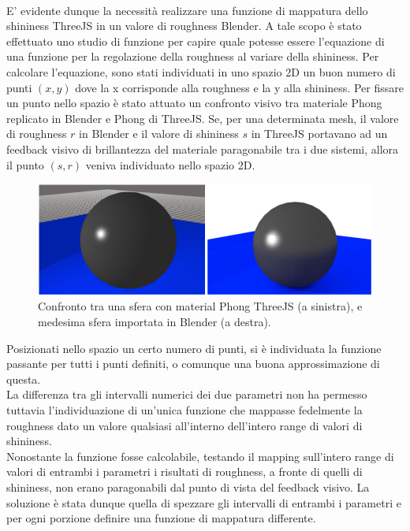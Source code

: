 \\
E’ evidente dunque la necessità realizzare una funzione di mappatura dello shininess ThreeJS in un valore di roughness Blender. A tale scopo è stato effettuato uno studio di funzione per capire quale potesse essere l’equazione di una funzione per la regolazione della roughness al variare della shininess. Per calcolare l’equazione, sono stati individuati in uno spazio 2D un buon numero di punti $(x,y)$ dove la x corrisponde alla roughness e la y alla shininess. Per fissare un punto nello spazio è stato attuato un confronto visivo tra materiale Phong replicato in Blender e Phong di ThreeJS. Se, per una determinata mesh, il valore di roughness $r$ in Blender e il valore di shininess $s$ in ThreeJS portavano ad un feedback visivo di brillantezza del materiale paragonabile tra i due sistemi, allora il punto $(s,r)$ veniva individuato nello spazio 2D. 
\\
\begin{figure}[htb]
 \centering
 \includegraphics[width=1\linewidth]{images/chapter_baking_service/ba_se_sferephong.png}\hfill
 \caption[Mapping Phong material]{Confronto tra una sfera con material Phong ThreeJS (a sinistra), e medesima sfera importata in Blender (a destra).}
 \label{fig:ba_se_sferephong}
\end{figure}
Posizionati nello spazio un certo numero di punti, si è individuata la funzione passante per tutti i punti definiti, o comunque una buona approssimazione di questa. 
\\
La differenza tra gli intervalli numerici dei due parametri non ha permesso tuttavia  l’individuazione di un’unica funzione che mappasse fedelmente la roughness dato un valore qualsiasi all’interno dell’intero range di valori di shininess. 
\\
Nonostante la funzione fosse calcolabile, testando il mapping sull’intero range di valori di entrambi i parametri i risultati di roughness, a fronte di quelli di shininess, non erano paragonabili dal punto di vista del feedback visivo. La soluzione è stata dunque quella di spezzare gli intervalli di entrambi i parametri e per ogni porzione definire una funzione di mappatura differente. 
